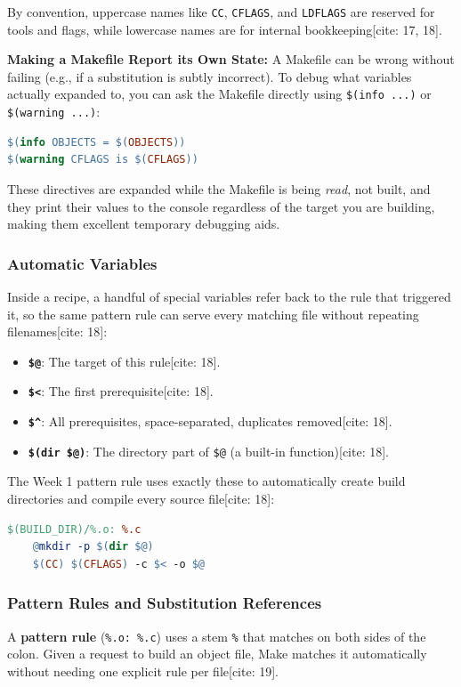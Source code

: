 By convention, uppercase names like \texttt{CC}, \texttt{CFLAGS}, and \texttt{LDFLAGS} are reserved for tools and flags, while lowercase names are for internal bookkeeping[cite: 17, 18].

\textbf{Making a Makefile Report its Own State:}
A Makefile can be wrong without failing (e.g., if a substitution is subtly incorrect). To debug what variables actually expanded to, you can ask the Makefile directly using \texttt{\$(info ...)} or \texttt{\$(warning ...)}:
\begin{lstlisting}[language=make]
$(info OBJECTS = $(OBJECTS))
$(warning CFLAGS is $(CFLAGS))
\end{lstlisting}
These directives are expanded while the Makefile is being \textit{read}, not built, and they print their values to the console regardless of the target you are building, making them excellent temporary debugging aids.

\subsubsection{Automatic Variables}
Inside a recipe, a handful of special variables refer back to the rule that triggered it, so the same pattern rule can serve every matching file without repeating filenames[cite: 18]:
\begin{itemize}
    \item \textbf{\texttt{\$@}}: The target of this rule[cite: 18].
    \item \textbf{\texttt{\$<}}: The first prerequisite[cite: 18].
    \item \textbf{\texttt{\$\^}}: All prerequisites, space-separated, duplicates removed[cite: 18].
    \item \textbf{\texttt{\$(dir \$@)}}: The directory part of \texttt{\$@} (a built-in function)[cite: 18].
\end{itemize}

The Week 1 pattern rule uses exactly these to automatically create build directories and compile every source file[cite: 18]:
\begin{lstlisting}[language=make]
$(BUILD_DIR)/%.o: %.c
	@mkdir -p $(dir $@)
	$(CC) $(CFLAGS) -c $< -o $@
\end{lstlisting}

\subsubsection{Pattern Rules and Substitution References}
A \textbf{pattern rule} (\texttt{\%.o: \%.c}) uses a stem \texttt{\%} that matches on both sides of the colon. Given a request to build an object file, Make matches it automatically without needing one explicit rule per file[cite: 19]. 

